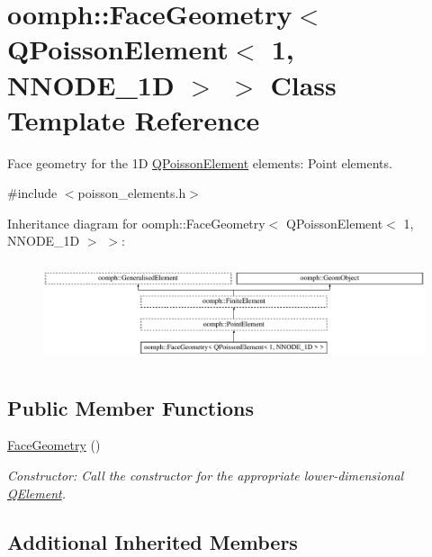 \hypertarget{classoomph_1_1FaceGeometry_3_01QPoissonElement_3_011_00_01NNODE__1D_01_4_01_4}{}\section{oomph\+:\+:Face\+Geometry$<$ Q\+Poisson\+Element$<$ 1, N\+N\+O\+D\+E\+\_\+1D $>$ $>$ Class Template Reference}
\label{classoomph_1_1FaceGeometry_3_01QPoissonElement_3_011_00_01NNODE__1D_01_4_01_4}


Face geometry for the 1D \hyperlink{classoomph_1_1QPoissonElement}{Q\+Poisson\+Element} elements\+: Point elements.  




{\ttfamily \#include $<$poisson\+\_\+elements.\+h$>$}

Inheritance diagram for oomph\+:\+:Face\+Geometry$<$ Q\+Poisson\+Element$<$ 1, N\+N\+O\+D\+E\+\_\+1D $>$ $>$\+:\begin{figure}[H]
\begin{center}
\leavevmode
\includegraphics[height=2.978724cm]{classoomph_1_1FaceGeometry_3_01QPoissonElement_3_011_00_01NNODE__1D_01_4_01_4}
\end{center}
\end{figure}
\subsection*{Public Member Functions}
\begin{DoxyCompactItemize}
\item 
\hyperlink{classoomph_1_1FaceGeometry_3_01QPoissonElement_3_011_00_01NNODE__1D_01_4_01_4_afd5f5f3ccd00da5c68f1e35c11f91c0f}{Face\+Geometry} ()
\begin{DoxyCompactList}\small\item\em Constructor\+: Call the constructor for the appropriate lower-\/dimensional \hyperlink{classoomph_1_1QElement}{Q\+Element}. \end{DoxyCompactList}\end{DoxyCompactItemize}
\subsection*{Additional Inherited Members}


